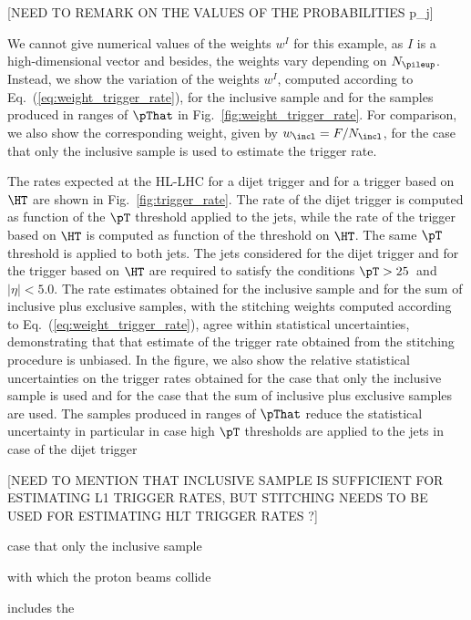 [NEED TO REMARK ON THE VALUES OF THE PROBABILITIES p_{j}]

We cannot give numerical values of the weights $w^{I}$ for this example,
as $I$ is a high-dimensional vector and besides, the weights vary depending on $N_{\pileup}$.
Instead, we show the variation of the weights $w^{I}$, computed according to Eq.~(\ref{eq:weight_trigger_rate}),
for the inclusive sample and for the samples produced in ranges of $\pThat$ in Fig.~\ref{fig:weight_trigger_rate}.
For comparison, we also show the corresponding weight, given by $w_{\incl} = F/N_{\incl}$,
for the case that only the inclusive sample is used to estimate the trigger rate.

\label{fig:weight_trigger_rate}

The rates expected at the HL-LHC for a dijet trigger and for a trigger based on $\HT$ are shown in Fig.~\ref{fig:trigger_rate}.
The rate of the dijet trigger is computed as function of the $\pT$ threshold applied to the jets,
while the rate of the trigger based on $\HT$ is computed as function of the threshold on $\HT$.
The same $\pT$ threshold is applied to both jets.
The jets considered for the dijet trigger and for the trigger based on $\HT$ are required to satisfy the conditions $\pT > 25$~\GeV and $\vert\eta\vert < 5.0$.
The rate estimates obtained for the inclusive sample and for the sum of inclusive plus exclusive samples, 
with the stitching weights computed according to Eq.~(\ref{eq:weight_trigger_rate}),
agree within statistical uncertainties, demonstrating that that estimate of the trigger rate obtained from the stitching procedure is unbiased.
In the figure, we also show the relative statistical uncertainties on the trigger rates obtained for the case that only the inclusive sample is used
and for the case that the sum of inclusive plus exclusive samples are used.
The samples produced in ranges of $\pThat$ reduce the statistical uncertainty in particular in case high $\pT$ thresholds are applied to the jets in case of the dijet trigger

[NEED TO MENTION THAT INCLUSIVE SAMPLE IS SUFFICIENT FOR ESTIMATING L1 TRIGGER RATES, BUT STITCHING NEEDS TO BE USED FOR ESTIMATING HLT TRIGGER RATES ?]

\label{fig:trigger_rate}




case that only the inclusive sample 



with which the proton beams collide

includes the 


